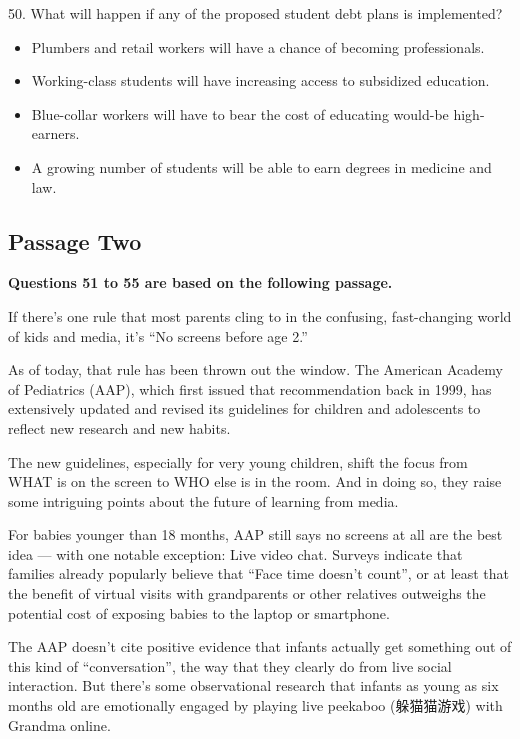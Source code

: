\documentclass[UTF8,11pt]{ctexart}
\begin{document}
50. What will happen if any of the proposed student debt plans is implemented?


\begin{itemize}[leftmargin=2em,itemsep=.2em,topsep=.4em]\item[A.] Plumbers and retail workers will have a chance of becoming professionals.
\item[B.] Working-class students will have increasing access to subsidized education.
\item[C.] Blue-collar workers will have to bear the cost of educating would-be high-earners.
\item[D.] A growing number of students will be able to earn degrees in medicine and law.
\end{itemize}

\subsection*{\textbf{Passage Two}}


\textbf{Questions 51 to 55 are based on the following passage.}


If there’s one rule that most parents cling to in the confusing, fast-changing world of kids and media, it’s “No screens before age 2.”


As of today, that rule has been thrown out the window. The American Academy of Pediatrics (AAP), which first issued that recommendation back in 1999, has extensively updated and revised its guidelines for children and adolescents to reflect new research and new habits.


The new guidelines, especially for very young children, shift the focus from WHAT is on the screen to WHO else is in the room. And in doing so, they raise some intriguing points about the future of learning from media.


For babies younger than 18 months, AAP still says no screens at all are the best idea — with one notable exception: Live video chat. Surveys indicate that families already popularly believe that “Face time doesn’t count”, or at least that the benefit of virtual visits with grandparents or other relatives outweighs the potential cost of exposing babies to the laptop or smartphone.


The AAP doesn’t cite positive evidence that infants actually get something out of this kind of “conversation”, the way that they clearly do from live social interaction. But there’s some observational research that infants as young as six months old are emotionally engaged by playing live peekaboo (躲猫猫游戏) with Grandma online.
\end{document}
